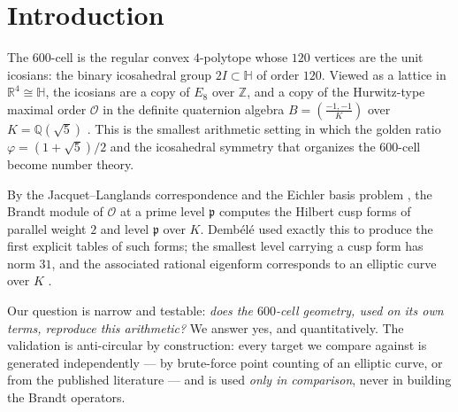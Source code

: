 \documentclass[11pt,a4paper]{article}
\newcommand{\Q}{\mathbb{Q}}
\newcommand{\Z}{\mathbb{Z}}
\newcommand{\R}{\mathbb{R}}
\newcommand{\Ord}{\mathcal{O}}
\newcommand{\fp}{\mathfrak{p}}
\begin{document}
\section{Introduction}\label{sec:intro}

The $600$-cell is the regular convex $4$-polytope whose $120$ vertices
are the unit icosians: the binary icosahedral group $2I\subset
\mathbb{H}$ of order $120$. Viewed as a lattice in $\R^4\cong\mathbb{H}$,
the icosians are a copy of $E_8$ over $\Z$, and a copy of the Hurwitz-type
maximal order $\Ord$ in the definite quaternion algebra
$B=\left(\tfrac{-1,-1}{K}\right)$ over $K=\Q(\sqrt5)$
\cite{ConwaySloane1999,Voight2021}. This is the smallest arithmetic
setting in which the golden ratio $\varphi=(1+\sqrt5)/2$ and the
icosahedral symmetry that organizes the $600$-cell become number
theory.

By the Jacquet--Langlands correspondence and the Eichler basis problem
\cite{JacquetLanglands1970,Eichler1973,Vigneras1980}, the Brandt module
of $\Ord$ at a prime level $\fp$ computes the Hilbert cusp forms of
parallel weight $2$ and level $\fp$ over $K$. Demb\'el\'e
\cite{Dembele2005} used exactly this to produce the first explicit
tables of such forms; the smallest level carrying a cusp form has norm
$31$, and the associated rational eigenform corresponds to an elliptic
curve over $K$ \cite{BoberEtAl2012}.

Our question is narrow and testable: \emph{does the $600$-cell geometry,
used on its own terms, reproduce this arithmetic?} We answer yes, and
quantitatively. The validation is anti-circular by construction: every
target we compare against is generated independently --- by brute-force
point counting of an elliptic curve, or from the published literature
--- and is used \emph{only in comparison}, never in building the Brandt
operators.
\end{document}
